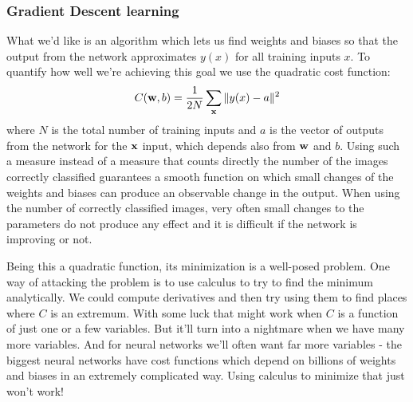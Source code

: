 \subsubsection{Gradient Descent learning}
What we'd like is an algorithm which lets us find weights and biases so that the output from the network approximates $y(x)$ for all training inputs $x$. To quantify how well we're achieving this goal we use the quadratic cost function:
\begin{equation}
C(\mathrm{\mathbf{w}}, b) = \frac{1}{2N}\sum_{\mathbf{x}} \|y(x)-a \|^2
\end{equation}
where $N$ is the total number of training inputs and $a$ is the vector of outputs from the network for the $\mathbf{x}$ input, which depends also from $\mathrm{\mathbf{w}}$ and $b$. Using such a measure instead of a measure that counts directly the number of the images correctly classified guarantees a smooth function on which small changes of the weights and biases can produce an observable change in the output. When using the number of correctly classified images, very often small changes to the parameters do not produce any effect and it is difficult if the network is improving or not.

Being this a quadratic function, its minimization is a well-posed problem. One way of attacking the problem is to use calculus to try to find the minimum analytically. We could compute derivatives and then try using them to find places where $C$ is an extremum. With some luck that might work when $C$ is a function of just one or a few variables. But it'll turn into a nightmare when we have many more variables. And for neural networks we'll often want far more variables - the biggest neural networks have cost functions which depend on billions of weights and biases in an extremely complicated way. Using calculus to minimize that just won't work!

